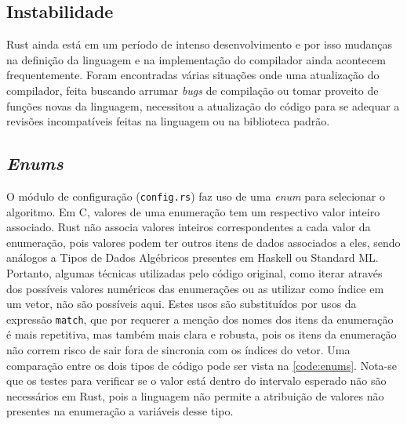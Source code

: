 \documentclass[tg]{mdtufsm}
\def\Cpp{{C\nolinebreak[4]\raisebox{.20ex}{\small\bf++}}}
\begin{document}
\subsection{Instabilidade}

Rust ainda está em um período de intenso desenvolvimento e por isso mudanças na definição da linguagem e na implementação do compilador ainda acontecem frequentemente. Foram encontradas várias situações onde uma atualização do compilador, feita buscando arrumar \emph{bugs} de compilação ou tomar proveito de funções novas da linguagem, necessitou a atualização do código para se adequar a revisões incompatíveis feitas na linguagem ou na biblioteca padrão.

\subsection{\emph{Enums}}

O módulo de configuração (\texttt{config.rs}) faz uso de uma \emph{enum} para selecionar o algoritmo. Em \Cpp, valores de uma enumeração tem um respectivo valor inteiro associado. Rust não associa valores inteiros correspondentes a cada valor da enumeração, pois valores podem ter outros itens de dados associados a eles, sendo análogos a Tipos de Dados Algébricos presentes em Haskell ou Standard ML.  Portanto, algumas técnicas utilizadas pelo código original, como iterar através dos possíveis valores numéricos das enumerações ou as utilizar como índice em um vetor, não são possíveis aqui. Estes usos são substituídos por usos da expressão \texttt{match}, que por requerer a menção dos nomes dos itens da enumeração é mais repetitiva, mas também mais clara e robusta, pois os itens da enumeração não correm risco de sair fora de sincronia com os índices do vetor. Uma comparação entre os dois tipos de código pode ser vista na \autoref{code:enums}. Nota-se que os testes para verificar se o valor está dentro do intervalo esperado não são necessários em Rust, pois a linguagem não permite a atribuição de valores não presentes na enumeração a variáveis desse tipo.
\end{document}
